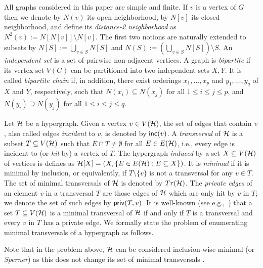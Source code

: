 All graphs considered in this paper are simple and finite.
If $v$ is a vertex of $G$ then we denote by $N(v)$ its open neighborhood, by $N[v]$ its closed neighborhood, and define its \emph{distance-2 neighborhood} as $N^2(v):=N[N[v]]\setminus N[v]$.
The first two notions are naturally extended to subsets by $N[S]:=\bigcup_{v\in S} N[S]$ and $N(S):=(\bigcup_{v\in S} N[S])\setminus S$.
An \emph{independent set} is a set of pairwise non-adjacent vertices.
A graph is \emph{bipartite} if its vertex set $V(G)$ can be partitioned into two independent sets $X,Y$.
It is called \emph{bipartite chain} if, in addition, there exist orderings $x_1,\dots,x_p$ and $y_1,\dots,y_q$ of $X$ and $Y$, respectively, such that $N(x_i)\subseteq N(x_j)$ for all $1\leq i\leq j\leq p$, and $N(y_i)\supseteq N(y_j)$ for all $1\leq i\leq j\leq q$.

Let $\mathcal{H}$ be a hypergraph.
Given a vertex $v\in V(\mathcal{H})$, the set of edges that contain $v$, also called edges \emph{incident} to $v$, is denoted by $\operatorname{{\sf inc}}(v)$.
A \emph{transversal} of $\mathcal{H}$ is a subset $T\subseteq V(\mathcal{H})$ such that $E\cap T\neq \emptyset$ for all $E\in E(\mathcal{H})$, i.e., every edge is incident to (or \emph{hit} by) a vertex of $T$.
The hypergraph \emph{induced} by a set $X\subseteq V(\mathcal{H})$ of vertices is defines as $\mathcal{H}[X]=(X, \{E\in E(\mathcal{H}): E\subseteq X\})$.
It is \emph{minimal} if it is minimal by inclusion, or equivalently, if $T\setminus\{v\}$ is not a transversal for any $v\in T$.
The set of minimal transversals of $\mathcal{H}$ is denoted by $Tr(\mathcal{H})$.
The \emph{private edges} of an element $v$ in a transversal $T$ are those edges of $\mathcal{H}$ which are only hit by $v$ in $T$; we denote the set of such edges by $\operatorname{{\sf priv}}(T,v)$.
It is well-known (see e.g.,~\cite{berge1984hypergraphs}) that a set $T\subseteq V(\mathcal{H})$ is a minimal transversal of $\mathcal{H}$ if and only if $T$ is a transversal and every $v$ in $T$ has a private edge. We formally state the problem of enumerating minimal transversals of a hypergraph as follows.

\begin{problemgen}
\end{problemgen}

Note that in the problem above, $\mathcal{H}$ can be considered inclusion-wise minimal (or \emph{Sperner}) as this does not change its set of minimal transversals \cite{eiter2008computational}.

